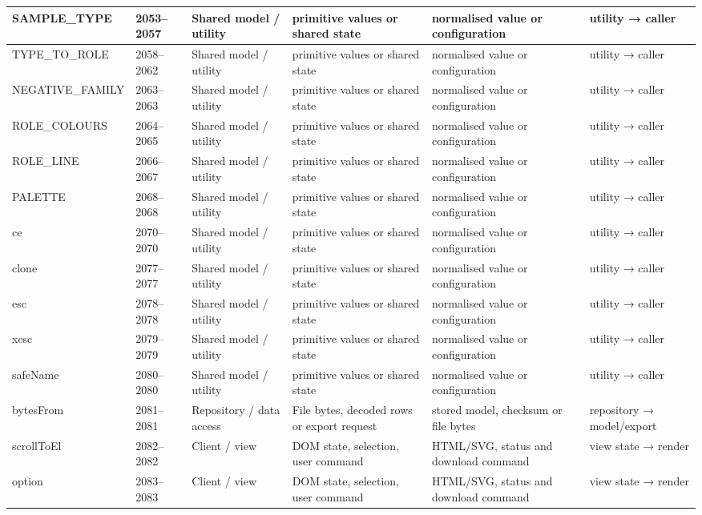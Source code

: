 \begin{landscape}
\begin{longtable}{@{}p{3.2cm}p{1.45cm}p{2.7cm}p{4.0cm}p{4.0cm}p{3.0cm}@{}}
SAMPLE\_TYPE & 2053--2057 & Shared model / utility & primitive values or shared state & normalised value or configuration & utility → caller \\\hline
TYPE\_TO\_ROLE & 2058--2062 & Shared model / utility & primitive values or shared state & normalised value or configuration & utility → caller \\\hline
NEGATIVE\_FAMILY & 2063--2063 & Shared model / utility & primitive values or shared state & normalised value or configuration & utility → caller \\\hline
ROLE\_COLOURS & 2064--2065 & Shared model / utility & primitive values or shared state & normalised value or configuration & utility → caller \\\hline
ROLE\_LINE & 2066--2067 & Shared model / utility & primitive values or shared state & normalised value or configuration & utility → caller \\\hline
PALETTE & 2068--2068 & Shared model / utility & primitive values or shared state & normalised value or configuration & utility → caller \\\hline
ce & 2070--2070 & Shared model / utility & primitive values or shared state & normalised value or configuration & utility → caller \\\hline
clone & 2077--2077 & Shared model / utility & primitive values or shared state & normalised value or configuration & utility → caller \\\hline
esc & 2078--2078 & Shared model / utility & primitive values or shared state & normalised value or configuration & utility → caller \\\hline
xesc & 2079--2079 & Shared model / utility & primitive values or shared state & normalised value or configuration & utility → caller \\\hline
safeName & 2080--2080 & Shared model / utility & primitive values or shared state & normalised value or configuration & utility → caller \\\hline
bytesFrom & 2081--2081 & Repository / data access & File bytes, decoded rows or export request & stored model, checksum or file bytes & repository → model/export \\\hline
scrollToEl & 2082--2082 & Client / view & DOM state, selection, user command & HTML/SVG, status and download command & view state → render \\\hline
option & 2083--2083 & Client / view & DOM state, selection, user command & HTML/SVG, status and download command & view state → render \\\hline

\end{longtable}
\end{landscape}
